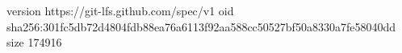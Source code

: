 version https://git-lfs.github.com/spec/v1
oid sha256:301fc5db72d4804fdb88ea76a6113f92aa588cc50527bf50a8330a7fe58040dd
size 174916
